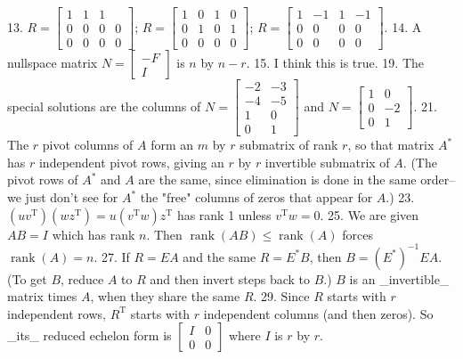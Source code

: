 13. \(R=\begin{bmatrix}1&1&1\\ 0&0&0&0\\ 0&0&0&0\end{bmatrix}\); \(R=\begin{bmatrix}1&0&1&0\\ 0&1&0&1\\ 0&0&0&0\end{bmatrix}\); \(R=\begin{bmatrix}1&-1&1&-1\\ 0&0&0&0\\ 0&0&0&0\end{bmatrix}\). 14. A nullspace matrix \(N=\begin{bmatrix}-F\\ I\end{bmatrix}\) is \(n\) by \(n-r\).
15. I think this is true.
19. The special solutions are the columns of \(N=\begin{bmatrix}-2&-3\\ -4&-5\\ 1&0\\ 0&1\end{bmatrix}\) and \(N=\begin{bmatrix}1&0\\ 0&-2\\ 0&1\end{bmatrix}\).
21. The \(r\) pivot columns of \(A\) form an \(m\) by \(r\) submatrix of rank \(r\), so that matrix \(A^{*}\) has \(r\) independent pivot rows, giving an \(r\) by \(r\) invertible submatrix of \(A\). (The pivot rows of \(A^{*}\) and \(A\) are the same, since elimination is done in the same order--we just don't see for \(A^{*}\) the "free" columns of zeros that appear for \(A\).)
23. \((uv^{\mathrm{T}})(wz^{\mathrm{T}})=u(v^{\mathrm{T}}w)z^{\mathrm{T}}\) has rank 1 unless \(v^{\mathrm{T}}w=0\).
25. We are given \(AB=I\) which has rank \(n\). Then \(\operatorname{rank}(AB)\leq\operatorname{rank}(A)\) forces \(\operatorname{rank}(A)=n\).
27. If \(R=EA\) and the same \(R=E^{*}B\), then \(B=(E^{*})^{-1}EA\). (To get \(B\), reduce \(A\) to \(R\) and then invert steps back to \(B\).) \(B\) is an _invertible_ matrix times \(A\), when they share the same \(R\).
29. Since \(R\) starts with \(r\) independent rows, \(R^{\mathrm{T}}\) starts with \(r\) independent columns (and then zeros). So _its_ reduced echelon form is \(\begin{bmatrix}I&0\\ 0&0\end{bmatrix}\) where \(I\) is \(r\) by \(r\).

 